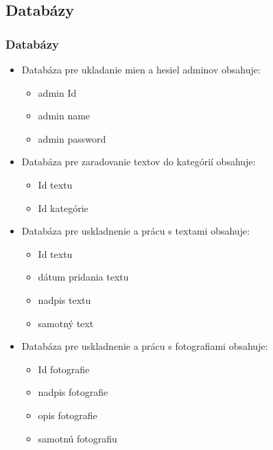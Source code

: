 \subsection{Databázy}
\begin{frame}\frametitle{Databázy}

  \begin{itemize}

         \item Databáza pre ukladanie mien a hesiel adminov obsahuje:
            \begin{itemize}
            \item admin Id
            \item admin name
            \item admin password
            \end{itemize}
         \item Databáza pre zaradovanie textov do kategórií obsahuje:
          \begin{itemize}
          \item Id textu
          \item Id kategórie
          \end{itemize}
         \item Databáza pre uskladnenie a prácu s textami obsahuje:
          \begin{itemize}
          \item Id textu
          \item dátum pridania textu
          \item nadpis textu
          \item samotný text
          \end{itemize}
         \item Databáza pre uskladnenie a prácu s fotografiami obsahuje:
          \begin{itemize}
          \item Id fotografie
          \item nadpis fotografie
          \item opis fotografie
          \item samotnú fotografiu
            \end{itemize}

  \end{itemize}


\end{frame}


